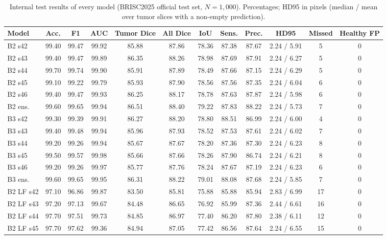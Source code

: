 \begin{table}[!ht]
\centering
\scriptsize
\caption{Internal test results of every model (BRISC2025 official test set, $N=1{,}000$). Percentages; HD95 in pixels (median / mean over tumor slices with a non-empty prediction).}
\label{tab:s-internal}
\begin{tabular}{lccccccccccc}
\toprule
Model & Acc. & F1 & AUC & Tumor Dice & All Dice & IoU & Sens. & Prec. & HD95 & Missed & Healthy FP \\
\midrule
B2 s42 & 99.40 & 99.47 & 99.92 & 85.88 & 87.86 & 78.36 & 87.38 & 87.67 & 2.24 / 5.91 & 5 & 0 \\
B2 s43 & 99.40 & 99.47 & 99.89 & 86.35 & 88.26 & 78.98 & 87.69 & 87.91 & 2.24 / 6.27 & 5 & 0 \\
B2 s44 & 99.70 & 99.74 & 99.90 & 85.91 & 87.89 & 78.49 & 87.66 & 87.15 & 2.24 / 6.29 & 5 & 0 \\
B2 s45 & 99.10 & 99.22 & 99.79 & 85.93 & 87.90 & 78.56 & 87.56 & 87.35 & 2.24 / 6.04 & 6 & 0 \\
B2 s46 & 99.40 & 99.47 & 99.93 & 86.25 & 88.17 & 78.78 & 87.63 & 87.87 & 2.24 / 5.98 & 6 & 0 \\
B2 ens. & 99.60 & 99.65 & 99.94 & 86.51 & 88.40 & 79.22 & 87.83 & 88.22 & 2.24 / 5.73 & 7 & 0 \\
B3 s42 & 99.30 & 99.39 & 99.91 & 86.27 & 88.20 & 78.80 & 88.51 & 86.99 & 2.24 / 6.00 & 4 & 0 \\
B3 s43 & 99.40 & 99.48 & 99.94 & 85.96 & 87.93 & 78.52 & 87.53 & 87.61 & 2.24 / 6.02 & 7 & 0 \\
B3 s44 & 99.20 & 99.26 & 99.94 & 85.67 & 87.67 & 78.20 & 87.36 & 87.30 & 2.24 / 6.23 & 8 & 0 \\
B3 s45 & 99.50 & 99.57 & 99.98 & 85.66 & 87.66 & 78.26 & 87.90 & 86.74 & 2.24 / 6.21 & 8 & 0 \\
B3 s46 & 99.20 & 99.26 & 99.97 & 85.77 & 87.76 & 78.24 & 87.67 & 87.19 & 2.24 / 6.23 & 6 & 0 \\
B3 ens. & 99.60 & 99.65 & 99.95 & 86.31 & 88.22 & 79.01 & 88.08 & 87.68 & 2.24 / 5.85 & 7 & 0 \\
B2 LF s42 & 97.10 & 96.86 & 99.87 & 83.50 & 85.81 & 75.88 & 85.88 & 85.94 & 2.83 / 6.99 & 17 & 0 \\
B2 LF s43 & 97.20 & 97.13 & 99.67 & 84.48 & 86.65 & 76.92 & 85.99 & 87.36 & 2.44 / 6.61 & 16 & 0 \\
B2 LF s44 & 97.70 & 97.51 & 99.73 & 84.85 & 86.97 & 77.40 & 86.20 & 87.80 & 2.38 / 6.11 & 12 & 0 \\
B2 LF s45 & 97.70 & 97.62 & 99.36 & 84.94 & 87.05 & 77.42 & 86.56 & 87.64 & 2.24 / 6.55 & 15 & 0 \\

\end{tabular}
\end{table}

